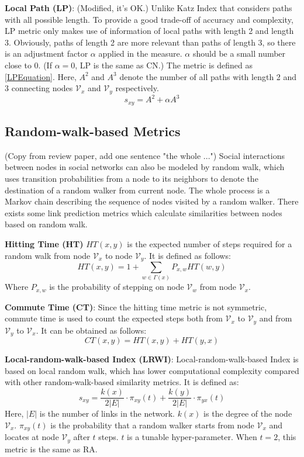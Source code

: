 \documentclass[\main/thesis.tex]{subfiles}
\begin{document}
\textbf{Local Path (LP)}: (Modified, it's OK.) Unlike Katz Index that considers paths with all possible length. To provide a good trade-off of accuracy and complexity, LP metric \cite{lu2009similarity} only makes use of information of local paths with length 2 and length 3. Obviously, paths of length 2 are more relevant than paths of length 3, so there is an adjustment factor $\alpha$ applied in the measure. $\alpha$ should be a small number close to 0. (If $\alpha=0$, LP is the same as CN.) The metric is defined as \ref{LPEquation}. Here, $A^2$ and $A^3$ denote the number of all paths with length 2 and 3 connecting nodes $\mathcal{V}_x$ and $\mathcal{V}_y$ respectively.
\begin{equation}\label{LPEquation}
s_{xy}=A^2 + \alpha A^3
\end{equation}

\subsection{Random-walk-based Metrics}
(Copy from review paper, add one sentence "the whole ...") Social interactions between nodes in social networks can also be modeled by random walk, which uses transition probabilities from a node to its neighbors to denote the destination of a random walker from current node. The whole process is a Markov chain describing the sequence of nodes visited by a random walker. There exists some link prediction metrics which calculate similarities between nodes based on random walk.

\textbf{Hitting Time (HT)} \cite{gobel1974random} $HT(x, y)$ is the expected number of steps required for a random walk from node $\mathcal{V}_x$ to node $\mathcal{V}_y$. It is defined as follows:
\begin{equation}
HT(x,y) = 1 + \sum_{w\in \Gamma(x)}P_{x,w}HT(w,y) 
\end{equation}
Where $P_{x,w}$ is the probability of stepping on node $\mathcal{V}_w$ from node $\mathcal{V}_x$.

\textbf{Commute Time (CT)}: Since the hitting time metric is not symmetric, commute time is used to count the expected steps both from $\mathcal{V}_x$ to $\mathcal{V}_y$ and from $\mathcal{V}_y$ to $\mathcal{V}_x$. It can be obtained as follows:
\begin{equation}
CT(x,y) = HT(x,y) + HT(y,x)
\end{equation}

\textbf{Local-random-walk-based Index (LRWI)}: Local-random-walk-based Index is based on local random walk, which has lower computational complexity compared with other random-walk-based similarity metrics. It is defined as:
\begin{equation}
s_{xy}=\frac{k(x)}{2|E|}\cdot \pi_{xy}(t) + \frac{k(y)}{2|E|}\cdot \pi_{yx}(t) 
\end{equation}
Here, $|E|$ is the number of links in the network. $k(x)$ is the degree of the node $\mathcal{V}_x$. $\pi_{xy}(t)$ is the probability that a random walker starts from node $\mathcal{V}_x$ and locates at node $\mathcal{V}_y$ after $t$ steps. $t$ is a tunable hyper-parameter. When $t=2$, this metric is the same as RA.
\end{document}
